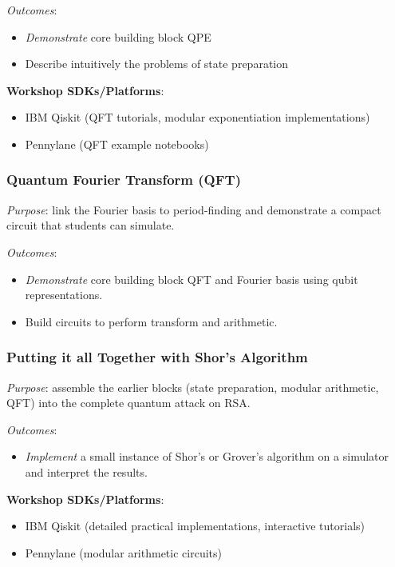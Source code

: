\emph{Outcomes}:
\begin{itemize}
	\item \emph{Demonstrate} core building block QPE
	\item Describe intuitively the problems of state preparation
\end{itemize}

\textbf{Workshop SDKs/Platforms}:
\begin{itemize}
	\item IBM Qiskit (QFT tutorials, modular exponentiation implementations)
	\item Pennylane (QFT example notebooks)
\end{itemize}

\subsubsection*{Quantum Fourier Transform (QFT)}

\emph{Purpose}: link the Fourier basis to period-finding 
and demonstrate a compact circuit that students can simulate.

\emph{Outcomes}:
\begin{itemize}
	\item \emph{Demonstrate} core building block QFT and Fourier basis using qubit representations.
	\item Build circuits to perform transform and arithmetic.
\end{itemize}

\subsubsection*{Putting it all Together with Shor's Algorithm}

\emph{Purpose}: assemble the earlier blocks 
(state preparation, modular arithmetic, QFT)
into the complete quantum attack on RSA.

\emph{Outcomes}:
\begin{itemize}
	\item \emph{Implement} a small instance of Shor's or Grover's algorithm on a simulator and interpret the results.
\end{itemize}

\textbf{Workshop SDKs/Platforms}:
\begin{itemize}
	\item IBM Qiskit (detailed practical implementations, interactive tutorials)
	\item Pennylane (modular arithmetic circuits)
\end{itemize}


